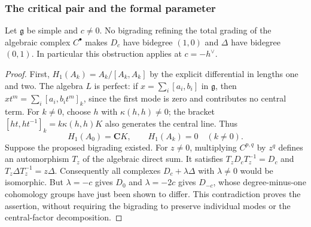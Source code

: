 \subsubsection{The critical pair and the formal parameter}

\begin{theorem}
\label{thm:km-critical-bigrading-obstruction}
Let $\mathfrak g$ be simple and $c\ne0$.  No bigrading refining the total
grading of the algebraic complex $C^\bullet$ makes $D_c$ have bidegree
$(1,0)$ and $\Delta$ have bidegree $(0,1)$.
In particular this obstruction applies at $c=-h^\vee$.
\end{theorem}
\begin{proof}
First, $H_1(A_k)=A_k/[A_k,A_k]$ by the explicit differential in lengths one
and two.  The algebra $L$ is perfect: if $x=\sum_i[a_i,b_i]$ in
$\mathfrak g$, then $xt^m=\sum_i[a_i,b_it^m]_k$, since the first mode is zero
and contributes no central term.  For $k\ne0$, choose $h$ with
$\kappa(h,h)\ne0$; the bracket $[ht,ht^{-1}]_k=k\kappa(h,h)K$ also generates
the central line.  Thus
\[
H_1(A_0)=\mathbf CK,\qquad H_1(A_k)=0\quad(k\ne0).
\]
Suppose the proposed bigrading existed.  For $z\ne0$, multiplying
$C^{p,q}$ by $z^q$ defines an automorphism $T_z$ of the algebraic direct sum.
It satisfies $T_zD_cT_z^{-1}=D_c$ and $T_z\Delta T_z^{-1}=z\Delta$.
Consequently all complexes $D_c+\lambda\Delta$ with $\lambda\ne0$ would
be isomorphic.  But $\lambda=-c$ gives $D_0$ and $\lambda=-2c$ gives
$D_{-c}$, whose degree-minus-one cohomology groups have just been shown to differ.
This contradiction proves the assertion, without requiring the bigrading
to preserve individual modes or the central-factor decomposition.
\end{proof}

